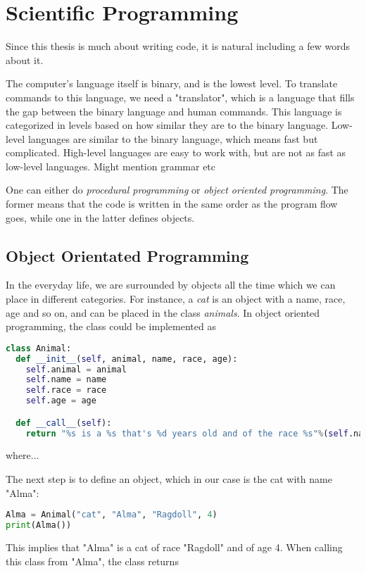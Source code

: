 \chapter{Scientific Programming}
Since this thesis is much about writing code, it is natural including a few words about it. 

The computer's language itself is binary, and is the lowest level. To translate commands to this language, we need a "translator", which is a language that fills the gap between the binary language and human commands. This language is categorized in levels based on how similar they are to the binary language. Low-level languages are similar to the binary language, which means fast but complicated. High-level languages are easy to work with, but are not as fast as low-level languages. Might mention grammar etc

One can either do \textit{procedural programming} or \textit{object oriented programming}. The former means that the code is written in the same order as the program flow goes, while one in the latter defines objects. 

\section{Object Orientated Programming}
In the everyday life, we are surrounded by objects all the time which we can place in different categories. For instance, a \textit{cat} is an object with a name, race, age and so on, and can be placed in the class \textit{animals}. In object oriented programming, the class could be implemented as

\lstset{basicstyle=\scriptsize}
\begin{lstlisting}[language=python]
class Animal:
  def __init__(self, animal, name, race, age):
    self.animal = animal
    self.name = name
    self.race = race
    self.age = age

  def __call__(self):
    return "%s is a %s that's %d years old and of the race %s"%(self.name, self.animal, self.age, self.race)
\end{lstlisting}
where...

The next step is to define an object, which in our case is the cat with name "Alma":

\lstset{basicstyle=\scriptsize}
\begin{lstlisting}[language=python]
Alma = Animal("cat", "Alma", "Ragdoll", 4)
print(Alma())
\end{lstlisting}
This implies that "Alma" is a cat of race "Ragdoll" and of age 4. When calling this class from "Alma", the class returns

